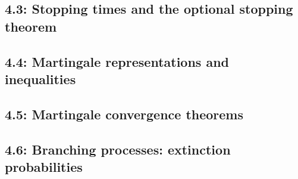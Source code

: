 \subsection*{4.3: Stopping times and the optional stopping theorem}

\subsection*{4.4: Martingale representations and inequalities}

\subsection*{4.5: Martingale convergence theorems}

\subsection*{4.6: Branching processes: extinction probabilities}
